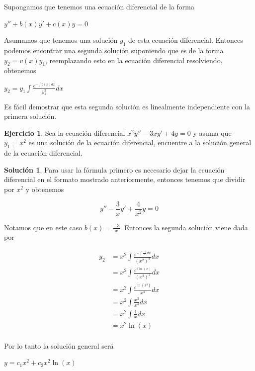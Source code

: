 \documentclass{article}
\theoremstyle{plain}
\theoremstyle{definition}
\newtheorem{ejer}[thm]{Ejercicio}
\newtheorem{sol}[thm]{Solución}
\begin{document}
Supongamos que tenemos una ecuación diferencial de la forma

\begin{center}
$y''+b(x)y'+c(x)y=0	$
\end{center}

Asumamos que tenemos una solución $y_1$ de esta ecuación diferencial. Entonces podemos encontrar una segunda solución suponiendo que es de la forma $y_2=v(x)y_1$, reemplazando esto en la ecuación diferencial resolviendo, obtenemos

\begin{center}
$\displaystyle y_2 =y_1 \int \frac{e^{-\int b(x)dx}}{y_1^2} dx$
\end{center}

Es fácil demostrar que esta segunda solución es linealmente independiente con la primera solución. \\

\begin{ejer}Sea la ecuación diferencial $x^2y''-3xy'+4y=0$ y asuma que $y_1=x^2$ es una solución de la ecuación diferencial, encuentre a la solución general de la ecuación diferencial. \\
\end{ejer}

\begin{sol}Para usar la fórmula primero es necesario dejar la ecuación diferencial en el formato mostrado anteriormente, entonces tenemos que dividir por $x^2$ y obtenemos
\end{sol}

\begin{center}
$$\displaystyle y''-\frac{3}{x} y'+\frac{4}{x^2} y=0$$
\end{center}

Notamos que en este caso $b(x)= \displaystyle \frac{-3}{x}$. Entonces la segunda solución viene dada por

\begin{align*}
\displaystyle y_2 &= x^2 \int \frac{e^{-\int \frac{-3}{x} dx}}{(x^2)^2} dx \\
 &= x^2 \int \frac{e^{3\ln(x)}}{(x^2)^2} dx \\
  &= x^2 \int \frac{e^{\ln(x^{3})}}{x^4} dx \\
&= x^2 \int \frac{x^{3}}{x^4} dx \\
&= x^2 \int \frac{1}{x} dx \\
&= x^2 \ln(x) \\
\end{align*}

Por lo tanto la solución general será

\begin{center}
$y = c_1 x^2+c_2x^2\ln(x)$
\end{center}
\end{document}
